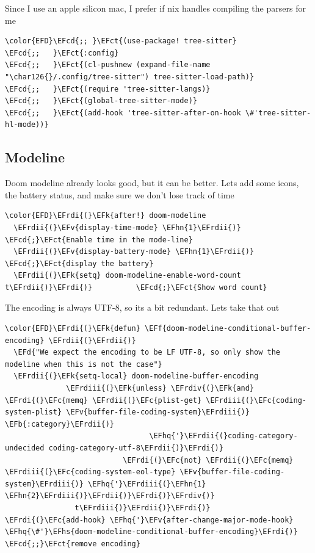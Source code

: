 \documentclass{scrartcl}
\newcommand{\EFk}[1]{\textcolor{EFk}{#1}} %
\newcommand{\EFd}[1]{\textcolor{EFd}{#1}} %
\newcommand{\EFb}[1]{\textcolor{EFb}{#1}} %
\newcommand{\EFct}[1]{\textcolor{EFct}{#1}} %
\newcommand{\EFc}[1]{\textcolor{EFc}{#1}} %
\newcommand{\EFv}[1]{\textcolor{EFv}{#1}} %
\newcommand{\EFf}[1]{\textcolor{EFf}{#1}} %
\newcommand{\EFcd}[1]{\textcolor{EFcd}{#1}} %
\newcommand{\EFhn}[1]{#1} %
\newcommand{\EFhq}[1]{#1} %
\newcommand{\EFhs}[1]{#1} %
\newcommand{\EFrdi}[1]{#1} %
\newcommand{\EFrdii}[1]{#1} %
\newcommand{\EFrdiii}[1]{#1} %
\newcommand{\EFrdiv}[1]{#1} %
\begin{document}
Since I use an apple silicon mac, I prefer if nix handles compiling the parsers for me
\begin{Code}
\begin{Verbatim}[]
\color{EFD}\EFcd{;; }\EFct{(use-package! tree-sitter}
\EFcd{;;   }\EFct{:config}
\EFcd{;;   }\EFct{(cl-pushnew (expand-file-name "\char126{}/.config/tree-sitter") tree-sitter-load-path)}
\EFcd{;;   }\EFct{(require 'tree-sitter-langs)}
\EFcd{;;   }\EFct{(global-tree-sitter-mode)}
\EFcd{;;   }\EFct{(add-hook 'tree-sitter-after-on-hook \#'tree-sitter-hl-mode))}
\end{Verbatim}
\end{Code}
\subsection{Modeline}
\label{sec:org0dcfcbe}
Doom modeline already looks good, but it can be better. Lets add some icons, the battery status, and make sure we don't lose track of time
\begin{Code}
\begin{Verbatim}[]
\color{EFD}\EFrdi{(}\EFk{after!} doom-modeline
  \EFrdii{(}\EFv{display-time-mode} \EFhn{1}\EFrdii{)}                              \EFcd{;}\EFct{Enable time in the mode-line}
  \EFrdii{(}\EFv{display-battery-mode} \EFhn{1}\EFrdii{)}                           \EFcd{;}\EFct{display the battery}
  \EFrdii{(}\EFk{setq} doom-modeline-enable-word-count t\EFrdii{)}\EFrdi{)}          \EFcd{;}\EFct{Show word count}
\end{Verbatim}
\end{Code}

The encoding is always UTF-8, so its a bit redundant. Lets take that out
\begin{Code}
\begin{Verbatim}[]
\color{EFD}\EFrdi{(}\EFk{defun} \EFf{doom-modeline-conditional-buffer-encoding} \EFrdii{(}\EFrdii{)}
  \EFd{"We expect the encoding to be LF UTF-8, so only show the modeline when this is not the case"}
  \EFrdii{(}\EFk{setq-local} doom-modeline-buffer-encoding
              \EFrdiii{(}\EFk{unless} \EFrdiv{(}\EFk{and} \EFrdi{(}\EFc{memq} \EFrdii{(}\EFc{plist-get} \EFrdiii{(}\EFc{coding-system-plist} \EFv{buffer-file-coding-system}\EFrdiii{)} \EFb{:category}\EFrdii{)}
                                 \EFhq{'}\EFrdii{(}coding-category-undecided coding-category-utf-8\EFrdii{)}\EFrdi{)}
                           \EFrdi{(}\EFc{not} \EFrdii{(}\EFc{memq} \EFrdiii{(}\EFc{coding-system-eol-type} \EFv{buffer-file-coding-system}\EFrdiii{)} \EFhq{'}\EFrdiii{(}\EFhn{1} \EFhn{2}\EFrdiii{)}\EFrdii{)}\EFrdi{)}\EFrdiv{)}
                t\EFrdiii{)}\EFrdii{)}\EFrdi{)}
\EFrdi{(}\EFc{add-hook} \EFhq{'}\EFv{after-change-major-mode-hook} \EFhq{\#'}\EFhs{doom-modeline-conditional-buffer-encoding}\EFrdi{)} \EFcd{;;}\EFct{remove encoding}
\end{Verbatim}
\end{Code}
\end{document}
